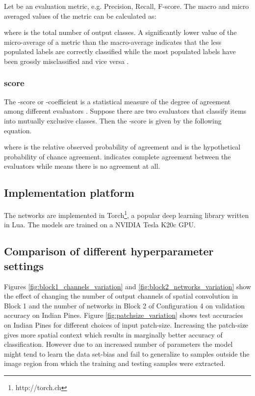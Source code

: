 \documentclass[journal]{IEEEtran}
\begin{document}
\indent Let  be an evaluation metric, e.g. Precision, Recall, F-score. The macro and micro averaged values of the metric can be calculated as:


where  is the total number of output classes. A significantly lower value of the micro-average of a metric than the macro-average indicates that the less populated labels are correctly classified while the most populated labels have been grossly misclassified and vice versa \cite{Sokolova:2009}.\\

\subsubsection{ score}
The -score or -coefficient is a statistical measure of the degree of agreement among different evaluators \cite{Cohen:1960}. Suppose there are two evaluators that classify  items into  mutually exclusive classes. Then the -score is given by the following equation.



\noindent where  is the relative observed probability of agreement and  is the hypothetical probability of chance agreement.  indicates complete agreement between the evaluators while  means there is no agreement at all.

\subsection{Implementation platform}
The networks are implemented in Torch\footnote{http://torch.ch}, a popular deep learning library written in Lua. The models are trained on a NVIDIA Tesla K20c GPU.

\subsection{Comparison of different hyperparameter settings}
\label{sec:hyperparameters}
Figures \ref{fig:block1_channels_variation} and \ref{fig:block2_networks_variation} show the effect of changing the number of output channels of  spatial convolution in Block 1 and the number of networks in Block 2 of Configuration 4 on validation accuracy on Indian Pines. Figure \ref{fig:patchsize_variation} shows test accuracies on Indian Pines for different choices of input patch-size. Increasing the patch-size gives more spatial context which results in marginally better accuracy of classification. However due to an increased number of parameters the model might tend to learn the data set-bias and fail to generalize to samples outside the image region from which the training and testing samples were extracted.\\
\end{document}
